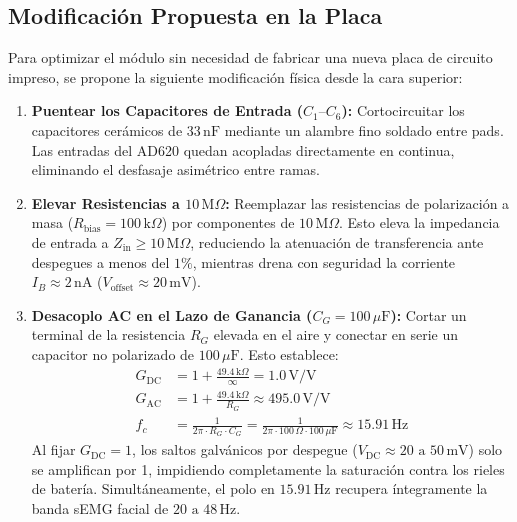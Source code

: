 \documentclass[10pt,a4paper]{article}
\begin{document}
\subsection{Modificación Propuesta en la Placa}
Para optimizar el módulo sin necesidad de fabricar una nueva placa de circuito impreso, se propone la siguiente modificación física desde la cara superior:
\begin{enumerate}
    \item \textbf{Puentear los Capacitores de Entrada ($C_1\text{--}C_6$):} Cortocircuitar los capacitores cerámicos de $33\,\text{nF}$ mediante un alambre fino soldado entre pads. Las entradas del AD620 quedan acopladas directamente en continua, eliminando el desfasaje asimétrico entre ramas.
    \item \textbf{Elevar Resistencias a $10\,\text{M}\Omega$:} Reemplazar las resistencias de polarización a masa ($R_{\text{bias}} = 100\,\text{k}\Omega$) por componentes de $10\,\text{M}\Omega$. Esto eleva la impedancia de entrada a $Z_{\text{in}} \ge 10\,\text{M}\Omega$, reduciendo la atenuación de transferencia ante despegues a menos del $1\%$, mientras drena con seguridad la corriente $I_B \approx 2\,\text{nA}$ ($V_{\text{offset}} \approx 20\,\text{mV}$).
    \item \textbf{Desacoplo AC en el Lazo de Ganancia ($C_G = 100\,\mu\text{F}$):} Cortar un terminal de la resistencia $R_G$ elevada en el aire y conectar en serie un capacitor no polarizado de $100\,\mu\text{F}$. Esto establece:
    \begin{align}
        G_{\text{DC}} &= 1 + \frac{49.4\,\text{k}\Omega}{\infty} = 1.0\,\text{V/V} \\
        G_{\text{AC}} &= 1 + \frac{49.4\,\text{k}\Omega}{R_G} \approx 495.0\,\text{V/V} \\
        f_c &= \frac{1}{2\pi \cdot R_G \cdot C_G} = \frac{1}{2\pi \cdot 100\,\Omega \cdot 100\,\mu\text{F}} \approx 15.91\,\text{Hz}
    \end{align}
    Al fijar $G_{\text{DC}} = 1$, los saltos galvánicos por despegue ($V_{\text{DC}} \approx 20\text{ a }50\,\text{mV}$) solo se amplifican por 1, impidiendo completamente la saturación contra los rieles de batería. Simultáneamente, el polo en $15.91\,\text{Hz}$ recupera íntegramente la banda sEMG facial de $20\text{ a }48\,\text{Hz}$.
\end{enumerate}
\end{document}
